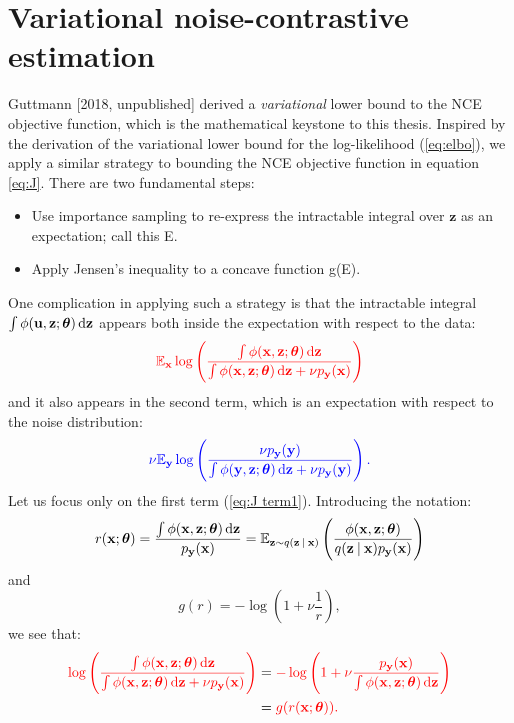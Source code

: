 \documentclass[11pt, oneside]{article}
\newcommand{\thetab}{{\boldsymbol{\theta}}}
\newcommand{\pnn}{\phi}
\newcommand{\pnoise}{p_{ \mathbf y}}
\newcommand{\q}[1]{q(\z \given{#1})}
\renewcommand{\u}{{\mathbf u}}
\newcommand{\x}{{\mathbf x}}
\newcommand{\y}{{\mathbf y}}
\newcommand{\z}{{\mathbf z}}
\newcommand{\E}{\mathbb{E}}
\newcommand{\Ex}{\E_{\x}}
\newcommand{\Ey}{\E_{\y}}
\newcommand{\Evar}[1]{\E_{\z \sim \q{#1}}}
\newcommand\given[1][]{\:#1\vert\:}
\theoremstyle{definition}
\begin{document}
\section{Variational noise-contrastive estimation}
\label{sec:VNCE}
Guttmann [2018, unpublished] derived a \emph{variational} lower bound to the NCE objective function, which is the mathematical keystone to this thesis. Inspired by the derivation of the variational lower bound for the log-likelihood (\ref{eq:elbo}), we apply a similar strategy to bounding the NCE objective function in equation \ref{eq:J}. There are two fundamental steps: 
\begin{itemize}
    \item Use importance sampling to re-express the intractable integral over $\z$ as an expectation; call this E.
    \item Apply Jensen’s inequality to a concave function g(E).
\end{itemize}
One complication in applying such a strategy is that the intractable integral $\int \pnn(\u, \z;\thetab) \dif \z$ appears both inside the expectation with respect to the data:
\begin{align}
    \color{red}{\Ex  \log \left(\frac{\int \pnn(\x, \z;\thetab) \dif \z}{\int \pnn(\x, \z;\thetab) \dif \z + \nu \pnoise(\x)}\right)}
    \label{eq:J term1}
\end{align}
and it also appears in the second term, which is an expectation with respect to the noise distribution:
\begin{align}
    \color{blue}{\nu \Ey \log \left( \frac{\nu \pnoise(\y)}{\int \pnn(\y, \z;\thetab) \dif \z + \nu \pnoise(\y)}\right).}
    \label{eq:J term2}
\end{align}
Let us focus only on the first term (\ref{eq:J term1}). Introducing the notation:
\begin{equation}
  r(\x;\thetab) = \frac{\int \pnn(\x, \z;\thetab) \dif \z}{\pnoise(\x)} = \Evar{\x} \left( \frac{\pnn(\x, \z;\thetab)}{\q{\x}\pnoise(\x)} \right)
  \label{eq:r-def}
\end{equation}
and
\begin{equation}
  g(r) = -\log \left(1+\nu \frac{1}{r} \right),
\end{equation}
we see that:
\begin{align}
    \color{red}{\log \left(\frac{\int \pnn(\x, \z;\thetab) \dif \z}{\int \pnn(\x, \z;\thetab) \dif \z + \nu \pnoise(\x)}\right)} 
    &= \color{red}{- \log \left( 1 + \nu \frac{\pnoise(\x)}{\int \pnn(\x, \z;\thetab) \dif \z}\right)} \\
    &=   \color{red}{g(r(\x; \thetab)).}
\end{align}
\end{document}

